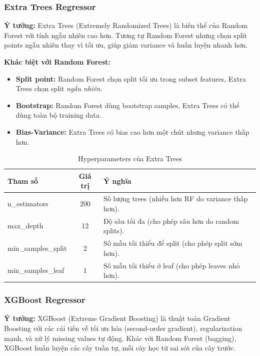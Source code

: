 \documentclass[12pt,a4paper]{article}
\begin{document}
\subsubsection{Extra Trees Regressor}

\textbf{Ý tưởng:} Extra Trees (Extremely Randomized Trees) là biến thể của Random Forest với tính ngẫu nhiên cao hơn. Tương tự Random Forest nhưng chọn split points ngẫu nhiên thay vì tối ưu, giúp giảm variance và huấn luyện nhanh hơn.

\textbf{Khác biệt với Random Forest:}
\begin{itemize}
    \item \textbf{Split point:} Random Forest chọn split tối ưu trong subset features, Extra Trees chọn split \textit{ngẫu nhiên}.
    \item \textbf{Bootstrap:} Random Forest dùng bootstrap samples, Extra Trees có thể dùng toàn bộ training data.
    \item \textbf{Bias-Variance:} Extra Trees có bias cao hơn một chút nhưng variance thấp hơn.
\end{itemize}

\begin{table}[H]
\centering
\caption{Hyperparameters của Extra Trees}
\begin{tabular}{|l|c|p{7cm}|}
\hline
\textbf{Tham số} & \textbf{Giá trị} & \textbf{Ý nghĩa} \\
\hline
n\_estimators & 200 & Số lượng trees (nhiều hơn RF do variance thấp hơn). \\
\hline
max\_depth & 12 & Độ sâu tối đa (cho phép sâu hơn do random splits). \\
\hline
min\_samples\_split & 2 & Số mẫu tối thiểu để split (cho phép split sớm hơn). \\
\hline
min\_samples\_leaf & 1 & Số mẫu tối thiểu ở leaf (cho phép leaves nhỏ hơn). \\
\hline
\end{tabular}
\end{table}

\subsubsection{XGBoost Regressor}

\textbf{Ý tưởng:} XGBoost (Extreme Gradient Boosting) là thuật toán Gradient Boosting với các cải tiến về tối ưu hóa (second-order gradient), regularization mạnh, và xử lý missing values tự động. Khác với Random Forest (bagging), XGBoost huấn luyện các cây tuần tự, mỗi cây học từ sai sót của cây trước.
\end{document}

